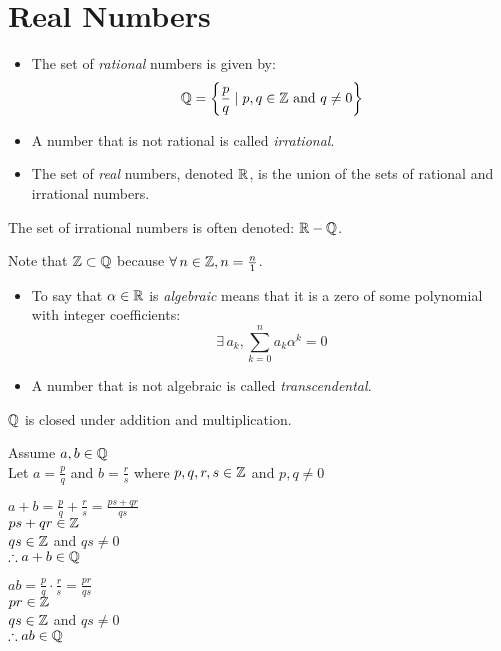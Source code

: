 \documentclass[letterpaper,12pt,fleqn]{article}
\renewcommand{\a}{\alpha}
\begin{document}
\section*{Real Numbers}

\begin{definition}
  \listbreak
  \begin{itemize}
    \item The set of \emph{rational} numbers is given by:
      \[\Q=\left\{\frac{p}{q}\mid p,q\in\Z\ \mbox{and}\ q\ne0\right\}\]

    \item A number that is not rational is called \emph{irrational}.

    \item The set of \emph{real} numbers, denoted $\mathbb{R}$, is the union of the
      sets of rational and irrational numbers.
  \end{itemize}
\end{definition}

The set of irrational numbers is often denoted: $\mathbb{R}-\mathbb{Q}$.

Note that $\mathbb{Z}\subset\mathbb{Q}$ because $\forall\,n\in\mathbb{Z},n=\frac{n}{1}$.

\begin{definition}
  \listbreak
  \begin{itemize}
  \item To say that $\a\in\R$ is \emph{algebraic} means that it is a zero of
    some polynomial with integer coefficients:
    \[\exists\,a_k,\sum_{k=0}^na_k\a^k=0\]

    \item A number that is not algebraic is called \emph{transcendental}.
  \end{itemize}
\end{definition}

\begin{theorem}
  $\mathbb{Q}$ is closed under addition and multiplication.
\end{theorem}

\begin{theproof}
  Assume $a,b\in\mathbb{Q}$ \\
  Let $a=\frac{p}{q}$ and $b=\frac{r}{s}$ where $p,q,r,s\in\mathbb{Z}$ and $p,q\ne0$

  \bigskip

  $a+b=\frac{p}{q}+\frac{r}{s}=\frac{ps+qr}{qs}$ \\
  $ps+qr\in\mathbb{Z}$ \\
  $qs\in\mathbb{Z}$ and $qs\ne0$ \\
  $\therefore a+b\in\mathbb{Q}$

  \bigskip

  $ab=\frac{p}{q}\cdot\frac{r}{s}=\frac{pr}{qs}$ \\
  $pr\in\mathbb{Z}$ \\
  $qs\in\mathbb{Z}$ and $qs\ne0$ \\
  $\therefore ab\in\mathbb{Q}$
\end{theproof}
\end{document}
